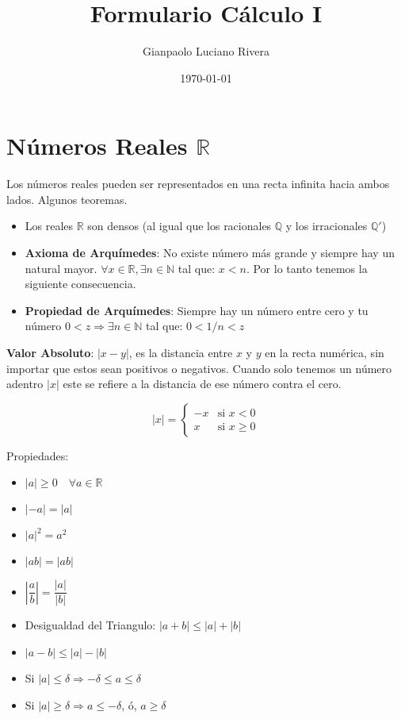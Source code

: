\documentclass[pdftex,11pt,a4paper]{article}
\title{Formulario Cálculo I}
\author{Gianpaolo Luciano Rivera}
\date{\today}
\begin{document}
\maketitle

\section{Números Reales $\mathbb{R}$}
Los números reales pueden ser representados en una recta infinita hacia ambos lados. Algunos teoremas.
\begin{itemize}
	\item Los reales $\mathbb{R}$ son densos (al igual que los racionales $\mathbb{Q}$ y los irracionales $\mathbb{Q}'$)
	\item \textbf{Axioma de Arquímedes}: No existe número más grande y siempre hay un natural mayor. $\forall x \in \mathbb{R}, \exists n \in \mathbb{N} $ tal que: $x < n$.  Por lo tanto tenemos la siguiente consecuencia.
	\item \textbf{Propiedad de Arquímedes}: Siempre hay un número entre cero y tu número $0<z \Rightarrow \exists n \in \mathbb{N}$ tal que: $0 < 1/n < z$
\end{itemize}

\textbf{Valor Absoluto}: $|x-y|$, es la distancia entre $x$ y $y$ en la recta numérica, sin importar que estos sean positivos o negativos. Cuando solo tenemos un número adentro $|x|$ este se refiere a la distancia de ese número contra el cero. 

$$|x| = \begin{cases} -x &\text{si } x < 0 \\ x &\text{si } x \geq  0\end{cases}$$

Propiedades: 
\begin{itemize}

	\item $|a| \geq 0 \quad \forall a \in \mathbb{R}$
	\item $|-a| = |a|$
	\item $|a|^2 = a^2$
	\item $|ab| = |ab|$
	\item $\left|\dfrac{a}{b}\right| = \dfrac{|a|}{|b|}$ 
	\item Desigualdad del Triangulo: $|a+b|\leq |a| + |b|$
	\item $|a-b|\leq |a| - |b|$	
	\item Si $|a| \leq \delta \Rightarrow -\delta \leq a \leq \delta$
	\item Si $|a| \geq \delta \Rightarrow a \leq - \delta$, ó, $a \geq \delta$ 
\end{itemize}
\end{document}
